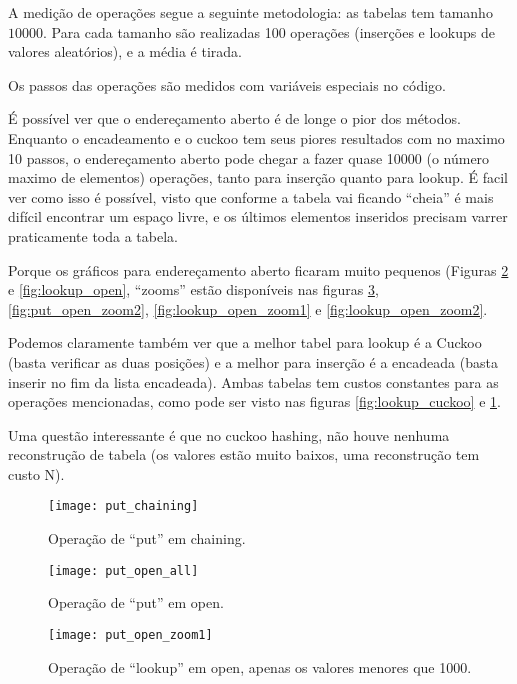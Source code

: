 \documentclass{article}
\begin{document}
A medição de operações segue a seguinte metodologia: as tabelas tem tamanho $10000$. Para cada
tamanho são realizadas 100 operações (inserções e lookups de valores aleatórios), e a média é
tirada.

Os passos das operações são medidos com variáveis especiais no código.

É possível ver que o endereçamento aberto é de longe o pior dos métodos. Enquanto o encadeamento e
o cuckoo tem seus piores resultados com no maximo 10 passos, o endereçamento aberto pode chegar a
fazer quase 10000 (o número maximo de elementos) operações, tanto para inserção quanto para lookup.
É facil ver como isso é possível, visto que conforme a tabela vai ficando ``cheia'' é mais difícil
encontrar um espaço livre, e os últimos elementos inseridos precisam varrer praticamente toda a
tabela.

Porque os gráficos para endereçamento aberto ficaram muito pequenos (Figuras \ref{fig:put_open} e
\ref{fig:lookup_open}, ``zooms'' estão disponíveis nas figuras \ref{fig:put_open_zoom1},
\ref{fig:put_open_zoom2}, \ref{fig:lookup_open_zoom1} e \ref{fig:lookup_open_zoom2}.

Podemos claramente também ver que a melhor tabel para lookup é a Cuckoo (basta verificar as duas
posições) e a melhor para inserção é a encadeada (basta inserir no fim da lista encadeada). Ambas
tabelas tem custos constantes para as operações mencionadas, como pode ser visto nas figuras
\ref{fig:lookup_cuckoo} e \ref{fig:put_chaining}.

Uma questão interessante é que no cuckoo hashing, não houve nenhuma reconstrução de tabela (os
valores estão muito baixos, uma reconstrução tem custo N).

\begin{figure}
  \centering
  \texttt{[image: put\_chaining]}
  \caption{Operação de ``put'' em chaining.}
  \label{fig:put_chaining}
\end{figure}

\begin{figure}
  \centering
  \texttt{[image: put\_open\_all]}
  \caption{Operação de ``put'' em open.}
  \label{fig:put_open}
\end{figure}

\begin{figure}
  \centering
  \texttt{[image: put\_open\_zoom1]}
  \caption{Operação de ``lookup'' em open, apenas os valores menores que 1000.}
  \label{fig:put_open_zoom1}
\end{figure}
\end{document}
